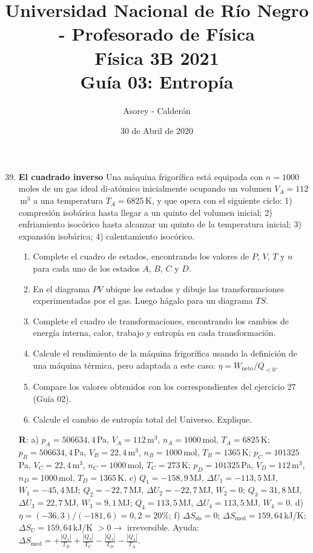 \documentclass[a4paper,12pt]{article}
\begin{document}
\title{
{\normalsize{Universidad Nacional de Río Negro - Profesorado de Física}}\\
Física 3B 2021 \\ Guía 03: Entropía
}
\author{Asorey - Calderón}
\date{30 de Abril de 2020}
\maketitle

\begin{enumerate}
	\setcounter{enumi}{38}     

    \item {\bf{El cuadrado inverso}}
		Una máquina frigorífica está equipada con $n=1000$\,moles de un gas
		ideal di-atómico inicialmente ocupando un volumen $V_A=112$\,m$^3$ a
		una temperatura $T_A=6825$\,K, y que opera con el siguiente ciclo: 1)
		compresión isobárica hasta llegar a un quinto del volumen inicial; 2)
		enfriamiento isocórico hasta alcanzar un quinto de la temperatura
		inicial; 3) expansión isobárica; 4) calentamiento isocórico.
		\begin{enumerate}
            \item Complete el cuadro de estados, encontrando los valores de
                $P$, $V$, $T$ y $n$ para cada uno de los estados $A$, $B$, $C$
                y $D$.
            \item En el diagrama $PV$ ubique los estados y dibuje las
				transformaciones experimentadas por el gas. Luego hágalo para
				un diagrama $TS$.
            \item Complete el cuadro de transformaciones, encontrando los
                cambios de energía interna, calor, trabajo y entropía en cada
                transformación.
			\item Calcule el rendimiento de la máquina frigorífica usando la
				definición de una máquina térmica, pero adaptada a este caso:
				$\eta=W_{\mathrm{neto}}/Q_{<0}$.
			\item Compare los valores obtenidos con los correspondientes del
				ejercicio 27 (Guía 02).
			\item Calcule el cambio de entropía total del Universo. Explique.
        \end{enumerate}
        {\bf{R}}: a) 
		$p_A=506634,4$\,Pa, $V_A=112$\,m$^3$, $n_A=1000$\,mol, $T_A=6825$\,K; 
		$p_B=506634,4$\,Pa, $V_B=22,4$\,m$^3$, $n_B=1000$\,mol, $T_B=1365$\,K; 
		$p_C=101325$\,Pa, $V_C=22,4$\,m$^3$, $n_C=1000$\,mol, $T_C=273$\,K; 
		$p_D=101325$\,Pa, $V_D=112$\,m$^3$, $n_D=1000$\,mol, $T_D=1365$\,K. 
		c) 
		$Q_1=-158,9$\,MJ, $\Delta U_1=-113,5$\,MJ, $W_1=-45,4$\,MJ;
		$Q_2=-22,7$\,MJ, $\Delta U_2=-22,7$\,MJ, $W_2=0$;
		$Q_3=31,8$\,MJ, $\Delta U_3=22,7$\,MJ, $W_3=9,1$\,MJ; 
        $Q_4=113,5$\,MJ, $\Delta U_4=113,5$\,MJ, $W_4=0$. 
		d) $\eta=(-36,3)/(-181,6) = 0,2 = 20\%$; 
		f) $\Delta S_{\mathrm{sis}} = 0$; $\Delta
		S_{\mathrm{med}}=159,64$\,kJ/K; $\Delta S_U=159,64$\,kJ/K $>0 \to$
		irreversible. Ayuda: $\Delta S_{\mathrm{med}} = +\frac{|Q_1|}{T_B} +
		\frac{|Q_2|}{T_C} - \frac{|Q_3|}{T_D} - \frac{|Q_4|}{T_A}$.
	

\end{enumerate}
\end{document}
